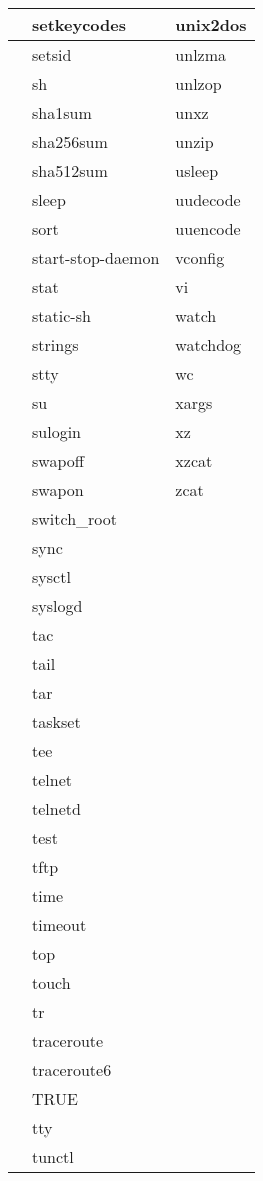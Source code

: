 \begin{longtable}{llp{64mm}}
 & setkeycodes & unix2dos \\ \hline
 & setsid & unlzma \\ \hline
 & sh & unlzop \\ \hline
 & sha1sum & unxz \\ \hline
 & sha256sum & unzip \\ \hline
 & sha512sum & usleep \\ \hline
 & sleep & uudecode \\ \hline
 & sort & uuencode \\ \hline
 & start-stop-daemon & vconfig \\ \hline
 & stat & vi \\ \hline
 & static-sh & watch \\ \hline
 & strings & watchdog \\ \hline
 & stty & wc \\ \hline
 & su & xargs \\ \hline
 & sulogin & xz \\ \hline
 & swapoff & xzcat \\ \hline
 & swapon & zcat \\ \hline
 & switch\_root &  \\ \hline
 & sync &  \\ \hline
 & sysctl &  \\ \hline
 & syslogd &  \\ \hline
 & tac &  \\ \hline
 & tail &  \\ \hline
 & tar &  \\ \hline
 & taskset &  \\ \hline
 & tee &  \\ \hline
 & telnet &  \\ \hline
 & telnetd &  \\ \hline
 & test &  \\ \hline
 & tftp &  \\ \hline
 & time &  \\ \hline
 & timeout &  \\ \hline
 & top &  \\ \hline
 & touch &  \\ \hline
 & tr &  \\ \hline
 & traceroute &  \\ \hline
 & traceroute6 &  \\ \hline
 & TRUE &  \\ \hline
 & tty &  \\ \hline
 & tunctl &  \\ \hline

\end{longtable}
